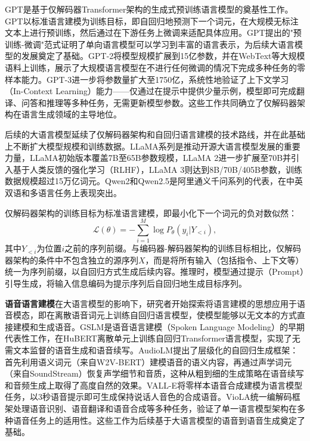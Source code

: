 GPT\citep{gpt1}是基于仅解码器Transformer架构的生成式预训练语言模型的奠基性工作。GPT以标准语言建模为训练目标，即自回归地预测下一个词元，在大规模无标注文本上进行预训练，然后通过在下游任务上微调来适配具体应用。GPT提出的"预训练-微调"范式证明了单向语言模型可以学习到丰富的语言表示，为后续大语言模型的发展奠定了基础。GPT-2\citep{radford2019language}将模型规模扩展到15亿参数，并在WebText等大规模语料上训练，展示了大规模语言模型在不进行任何微调的情况下完成多种任务的零样本能力。GPT-3\citep{brown2020gpt3}进一步将参数量扩大至1750亿，系统性地验证了上下文学习（In-Context Learning）能力——仅通过在提示中提供少量示例，模型即可完成翻译、问答和推理等多种任务，无需更新模型参数。这些工作共同确立了仅解码器架构在语言生成领域的主导地位。

后续的大语言模型延续了仅解码器架构和自回归语言建模的技术路线，并在此基础上不断扩大模型规模和训练数据。LLaMA\citep{touvron2023llama}系列是推动开源大语言模型发展的重要力量，LLaMA初始版本覆盖7B至65B参数规模，LLaMA 2\citep{touvron2023llama2}进一步扩展至70B并引入基于人类反馈的强化学习（RLHF），LLaMA 3\citep{dubey2024llama3}则达到8B/70B/405B参数，训练数据规模超过15万亿词元。Qwen2\citep{yang2024qwen2}和Qwen2.5\citep{yang2025qwen25}是阿里通义千问系列的代表，在中英双语和多语言任务上表现突出。

仅解码器架构的训练目标为标准语言建模，即最小化下一个词元的负对数似然：
\begin{equation}
\mathcal{L}(\theta)=-\sum_{i=1}^{M}\log P_\theta(y_i|Y_{<i}),
\end{equation}
其中$Y_{<i}$为位置$i$之前的序列前缀。与编码器-解码器架构的训练目标相比，仅解码器架构的条件中不包含独立的源序列$X$，而是将所有输入（包括指令、上下文等）统一为序列前缀，以自回归方式生成后续内容。推理时，模型通过提示（Prompt）引导生成，将输入信息编码为提示序列后自回归地生成目标序列。

\textbf{语音语言建模}\quad 在大语言模型的影响下，研究者开始探索将语言建模的思想应用于语音模态，即在离散语音词元上训练自回归语言模型，使模型能够以无文本的方式直接建模和生成语音。GSLM\citep{lakhotia2021generative}是语音语言建模（Spoken Language Modeling）的早期代表性工作，在HuBERT离散单元上训练自回归Transformer语言模型，实现了无需文本监督的语音生成和语音续写。AudioLM\citep{borsos2023audiolm}提出了层级化的自回归生成框架：首先利用语义词元（来自W2V-BERT）建模语音的语义内容，再通过声学词元（来自SoundStream）恢复声学细节和音质，这种从粗到细的生成策略在语音续写和音频生成上取得了高度自然的效果。VALL-E\citep{wang-etal-2023-valle}将零样本语音合成建模为语言模型任务，以3秒语音提示即可生成保持说话人音色的合成语音。VioLA\citep{wang2023viola}统一编解码框架处理语音识别、语音翻译和语音合成等多种任务，验证了单一语言模型架构在多种语音任务上的适用性。这些工作为后续基于大语言模型的语音到语音生成奠定了基础。


